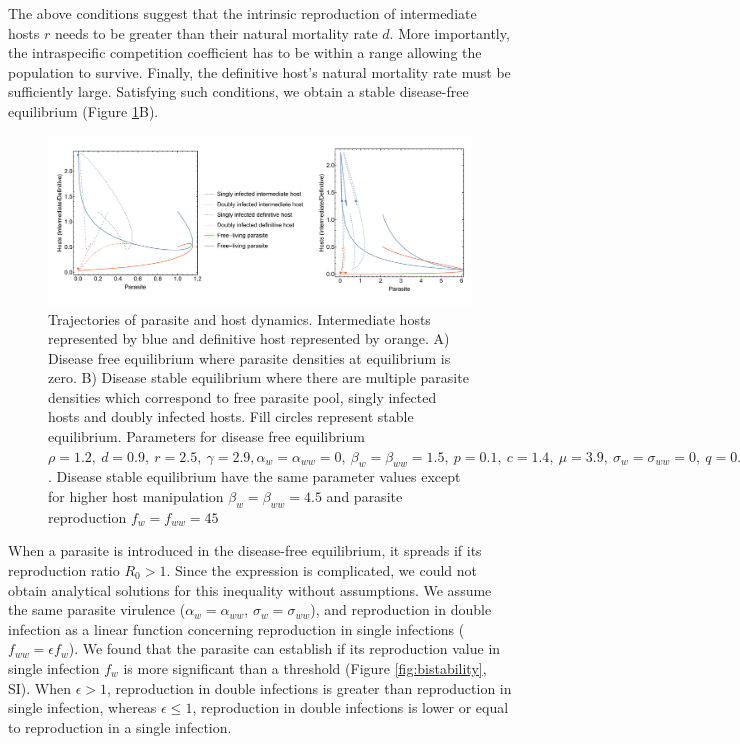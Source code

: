 \documentclass[11pt]{article}
\begin{document}
The above conditions suggest that the intrinsic reproduction of intermediate hosts $r$ needs to be greater than their natural mortality rate $d$. 
More importantly, the intraspecific competition coefficient has to be within a range allowing the population to survive.
Finally, the definitive host's natural mortality rate must be sufficiently large. 
Satisfying such conditions, we obtain a stable disease-free equilibrium (Figure \ref{fig:ecotraject:nonlinear}B).

\begin{figure}[!ht]
\includegraphics[width=\textwidth]{Figures/ecotraject_nonlinear.pdf}
\caption{Trajectories of parasite and host dynamics. Intermediate hosts represented by blue and definitive host represented by orange. A) Disease free equilibrium where parasite densities at equilibrium is zero. B) Disease stable equilibrium where there are multiple parasite densities which correspond to free parasite pool, singly infected hosts and doubly infected hosts. Fill circles represent stable equilibrium. Parameters for disease free equilibrium $\rho =  1.2, \ d = 0.9, \  r = 2.5, \ \gamma =  2.9, \alpha_w = \alpha_{ww} =  0, \ \beta_w = \beta_{ww} = 1.5, \ p = 0.1, \  c = 1.4, \ \mu = 3.9, \ \sigma_w = \sigma_{ww} = 0, \ q = 0.01, \ f_w = f_{ww} = 7.5, \ \delta = 0.9, \ k = 0.26$. Disease stable equilibrium have the same parameter values except for higher host manipulation $ \beta_w =  \beta_{ww} = 4.5$ and parasite reproduction $ f_w  = f_{ww} = 45$}
\label{fig:ecotraject:nonlinear}
\end{figure}

When a parasite is introduced in the disease-free equilibrium, it spreads if its reproduction ratio $R_0 > 1$. 
Since the expression is complicated, we could not obtain analytical solutions for this inequality without assumptions. 
We assume the same parasite virulence ($\alpha_w = \alpha_{ww}$, $\sigma_w = \sigma_{ww}$), and reproduction in double infection as a linear function concerning reproduction in single infections ($f_{ww} = \epsilon f_w$).
We found that the parasite can establish if its reproduction value in single infection $f_w$ is more significant than a threshold (Figure \ref{fig:bistability}, SI). 
When $\epsilon > 1$, reproduction in double infections is greater than reproduction in single infection, whereas $\epsilon \leq 1$, reproduction in double infections is lower or equal to reproduction in a single infection.
 
\end{document}
